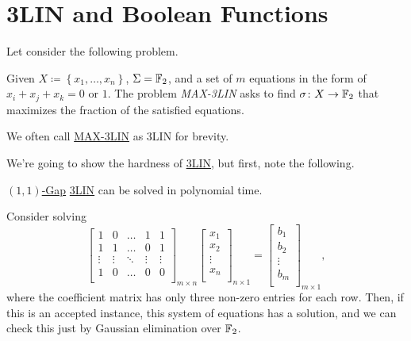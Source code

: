 \section{3LIN and Boolean Functions}
Let consider the following problem.
\begin{problem}\label{prb:max-3LIN}
Given \(X\coloneqq \left\{ x_1, \ldots , x_n  \right\} \), \(\Sigma = \mathbb{\MakeUppercase{f}} _2\), and a set of \(m\) equations in the form of \(x_i + x_j + x_k = 0\) or \(1\). The problem \emph{MAX-3LIN} asks to find \(\sigma \colon X\to \mathbb{\MakeUppercase{f}} _2\) that maximizes the fraction of the satisfied equations.
\end{problem}

\begin{remark}
	We often call \hyperref[prb:max-3LIN]{MAX-3LIN} as 3LIN for brevity.
\end{remark}

We're going to show the hardness of \hyperref[prb:max-3LIN]{3LIN}, but first, note the following.
\begin{claim}
	\hyperref[def:c-s-Gap]{\((1, 1)\)-Gap} \hyperref[prb:max-3LIN]{3LIN} can be solved in polynomial time.
\end{claim}
\begin{explanation}
	Consider solving
	\[
		\begin{bmatrix}
			1      & 0      & \ldots & 1      & 1      \\
			1      & 1      & \ldots & 0      & 1      \\
			\vdots & \vdots & \ddots & \vdots & \vdots \\
			1      & 0      & \ldots & 0      & 0      \\
		\end{bmatrix}_{m\times n} \begin{bmatrix}
			x_1    \\
			x_2    \\
			\vdots \\
			x_n    \\
		\end{bmatrix}_{n\times 1} = \begin{bmatrix}
			b_1    \\
			b_2    \\
			\vdots \\
			b_m    \\
		\end{bmatrix}_{m\times 1},
	\]
	where the coefficient matrix has only three non-zero entries for each row. Then, if this is an accepted instance, this system of equations has a solution, and we can check this just by Gaussian elimination over \(\mathbb{\MakeUppercase{f}} _2\).
\end{explanation}

